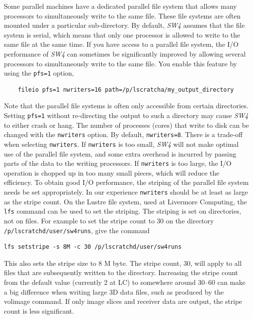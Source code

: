 \documentclass[11pt]{report}
\begin{document}
Some parallel machines have a dedicated parallel file system that allows many processors to
simultaneously write to the same file. These file systems are often mounted under a particular
sub-directory. By default, \emph{SW4} assumes that the file system is serial, which means that only
one processor is allowed to write to the same file at the same time. If you have access to a
parallel file system, the I/O performance of \emph{SW4} can sometimes be significantly improved by allowing
several processors to simultaneously write to the same file. You enable this feature by using the {\tt pfs=1}
option,
\begin{verbatim}
	fileio pfs=1 nwriters=16 path=/p/lscratcha/my_output_directory
\end{verbatim}
Note that the parallel file systems is often only accessible from certain
directories. Setting \verb+pfs=1+ without re-directing the output to such a directory may cause
\emph{SW4} to either crash or hang.
The number of processes (cores) that write to disk can be changed with the \verb+nwriters+
option. By default, \verb+nwriters=8+. There is a trade-off when selecting \verb+nwriters+.
If \verb+nwriters+  is too small, \emph{SW4} will not make optimal use of the parallel file system, and some
extra overhead is incurred by passing parts of the data to the writing processors. If \verb+nwriters+ is 
too large, the I/O operation is chopped up in too many small pieces, which will reduce the efficiency. 
To obtain good I/O performance, the striping of the parallel file system needs be set appropriately. In our experience
\verb+nwriters+ should be at least as large as the stripe count. On the Lustre file system, used at Livermore Computing,
the \verb+lfs+ command can be used to set the striping. The striping is set on directories, not on files.
For example to set the stripe count to 30 on the directory \verb+/p/lscratchd/user/sw4runs+, give the command
\begin{verbatim}
lfs setstripe -s 8M -c 30 /p/lscratchd/user/sw4runs
\end{verbatim}
This also sets the stripe size to 8 M byte. The stripe count, 30, will apply to all files that are subsequently
written to the directory. Increasing the stripe count from the default value (currently 2 at LC)
to somewhere around 30--60 can make a big difference when writing large 3D data files, 
such as produced by the volimage command. If only image slices and receiver data are output, the stripe count
is less significant.

\end{document}
